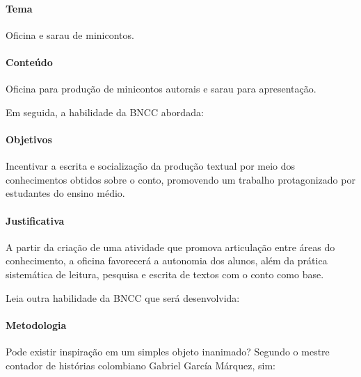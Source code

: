 \documentclass[11pt]{extarticle}
\begin{document}
\paragraph{Tema} Oficina e sarau de minicontos.

\paragraph{Conteúdo}
Oficina para produção de minicontos autorais e sarau para apresentação.

Em seguida, a habilidade da BNCC abordada:

\paragraph{Objetivos}
Incentivar a escrita e socialização da produção textual por meio dos
conhecimentos obtidos sobre o conto, promovendo um trabalho
protagonizado por estudantes do ensino médio.

\paragraph{Justificativa}
A partir da criação de uma atividade que promova articulação entre áreas
do conhecimento, a oficina favorecerá a autonomia dos alunos, além da
prática sistemática de leitura, pesquisa e escrita de textos com o conto
como base.

Leia outra habilidade da BNCC que será desenvolvida:

\paragraph{Metodologia}
Pode existir inspiração em um simples objeto inanimado? Segundo o mestre
contador de histórias colombiano Gabriel García Márquez, sim:
\end{document}
